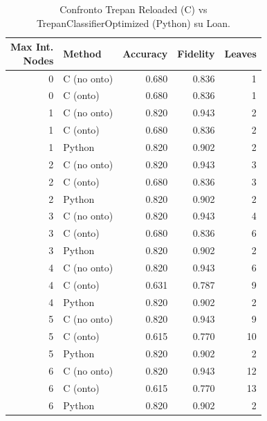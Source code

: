 \begin{table}[ht]
\centering
\footnotesize
\begin{tabular}{r l r r r}
\toprule
\makecell{Max Int.\\Nodes} & Method & Accuracy & Fidelity & Leaves \\
\midrule
0 & C (no onto)  & 0.680 & 0.836 & 1 \\
0 & C (onto)     & 0.680 & 0.836 & 1 \\
\midrule
1 & C (no onto)  & 0.820 & 0.943 & 2 \\
1 & C (onto)     & 0.680 & 0.836 & 2 \\
1 & Python       & 0.820 & 0.902 & 2 \\
\midrule
2 & C (no onto)  & 0.820 & 0.943 & 3 \\
2 & C (onto)     & 0.680 & 0.836 & 3 \\
2 & Python       & 0.820 & 0.902 & 2 \\
\midrule
3 & C (no onto)  & 0.820 & 0.943 & 4 \\
3 & C (onto)     & 0.680 & 0.836 & 6 \\
3 & Python       & 0.820 & 0.902 & 2 \\
\midrule
4 & C (no onto)  & 0.820 & 0.943 & 6 \\
4 & C (onto)     & 0.631 & 0.787 & 9 \\
4 & Python       & 0.820 & 0.902 & 2 \\
\midrule
5 & C (no onto)  & 0.820 & 0.943 & 9 \\
5 & C (onto)     & 0.615 & 0.770 & 10 \\
5 & Python       & 0.820 & 0.902 & 2 \\
\midrule
6 & C (no onto)  & 0.820 & 0.943 & 12 \\
6 & C (onto)     & 0.615 & 0.770 & 13 \\
6 & Python       & 0.820 & 0.902 & 2 \\
\bottomrule
\end{tabular}
\caption{Confronto Trepan Reloaded (C) vs TrepanClassifierOptimized (Python) su Loan.}
\label{tab:c_vs_python_loan}
\end{table}